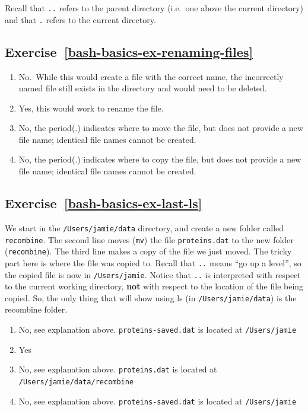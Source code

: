 \documentclass[
]{krantz}
\providecommand{\tightlist}{%
  \setlength{\itemsep}{0pt}\setlength{\parskip}{0pt}}
\begin{document}
Recall that \texttt{..} refers to the parent directory (i.e.~one above the current directory)
and that \texttt{.} refers to the current directory.

\hypertarget{exercise-refbash-basics-ex-renaming-files}{%
\subsection*{Exercise~\ref{bash-basics-ex-renaming-files}}\label{exercise-refbash-basics-ex-renaming-files}}


\begin{enumerate}
\def\labelenumi{\arabic{enumi}.}
\tightlist
\item
  No.~While this would create a file with the correct name,
  the incorrectly named file still exists in the directory and would need to be deleted.
\item
  Yes, this would work to rename the file.
\item
  No, the period(.) indicates where to move the file, but does not provide a new file name;
  identical file names cannot be created.
\item
  No, the period(.) indicates where to copy the file, but does not provide a new file name;
  identical file names cannot be created.
\end{enumerate}

\hypertarget{exercise-refbash-basics-ex-last-ls}{%
\subsection*{Exercise~\ref{bash-basics-ex-last-ls}}\label{exercise-refbash-basics-ex-last-ls}}


We start in the \texttt{/Users/jamie/data} directory, and create a new folder called \texttt{recombine}.
The second line moves (\texttt{mv}) the file \texttt{proteins.dat} to the new folder (\texttt{recombine}).
The third line makes a copy of the file we just moved. The tricky part here is where the file was
copied to. Recall that \texttt{..} means ``go up a level'', so the copied file is now in \texttt{/Users/jamie}.
Notice that \texttt{..} is interpreted with respect to the current working
directory, \textbf{not} with respect to the location of the file being copied.
So, the only thing that will show using ls (in \texttt{/Users/jamie/data}) is the recombine folder.

\begin{enumerate}
\def\labelenumi{\arabic{enumi}.}
\tightlist
\item
  No, see explanation above. \texttt{proteins-saved.dat} is located at \texttt{/Users/jamie}
\item
  Yes
\item
  No, see explanation above. \texttt{proteins.dat} is located at \texttt{/Users/jamie/data/recombine}
\item
  No, see explanation above. \texttt{proteins-saved.dat} is located at \texttt{/Users/jamie}
\end{enumerate}
\end{document}
